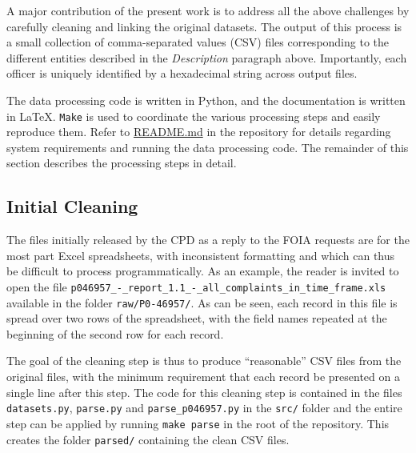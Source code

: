 A major contribution of the present work is to address all the above challenges
by carefully cleaning and linking the original datasets. The output of this
process is a small collection of comma-separated values (CSV) files
corresponding to the different entities described in the \emph{Description}
paragraph above. Importantly, each officer is uniquely identified by
a hexadecimal string across output files.

The data processing code is written in Python, and the documentation is written
in \LaTeX.  \texttt{Make} is used to coordinate the various processing steps
and easily reproduce them.  Refer to \url{README.md} in the repository for
details regarding system requirements and running the data processing code. The
remainder of this section describes the processing steps in detail.

\subsection{Initial Cleaning}

The files initially released by the CPD as a reply to the FOIA requests are for
the most part Excel spreadsheets, with inconsistent formatting and which can
thus be difficult to process programmatically. As an example, the reader is
invited to open the file
\texttt{p046957\_-\_report\_1.1\_-\_all\_complaints\_in\_time\_frame.xls}
available in the folder \texttt{raw/P0-46957/}. As can be seen, each record in
this file is spread over two rows of the spreadsheet, with the field names
repeated at the beginning of the second row for each record.

The goal of the cleaning step is thus to produce ``reasonable'' CSV files from
the original files, with the minimum requirement that each record be presented
on a single line after this step. The code for this cleaning step is contained
in the files \texttt{datasets.py}, \texttt{parse.py} and
\texttt{parse\_p046957.py} in the \texttt{src/} folder and the entire step can
be applied by running \texttt{make parse} in the root of the repository. This
creates the folder \texttt{parsed/} containing the clean CSV files.

